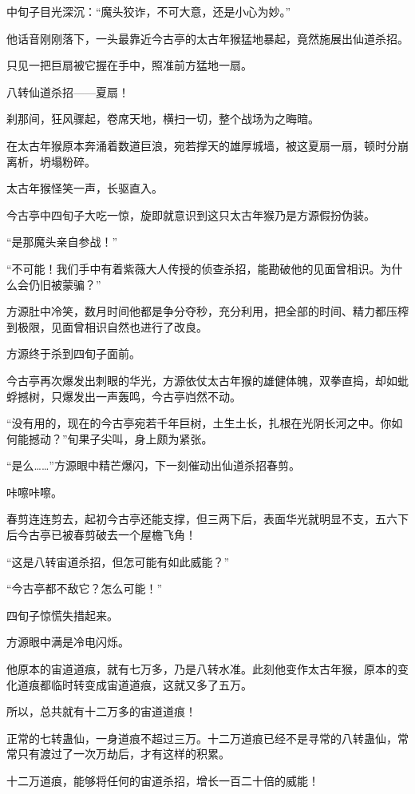 \begin{this_body}
中旬子目光深沉：“魔头狡诈，不可大意，还是小心为妙。”

他话音刚刚落下，一头最靠近今古亭的太古年猴猛地暴起，竟然施展出仙道杀招。

只见一把巨扇被它握在手中，照准前方猛地一扇。

八转仙道杀招——夏扇！

刹那间，狂风骤起，卷席天地，横扫一切，整个战场为之晦暗。

在太古年猴原本奔涌着数道巨浪，宛若撑天的雄厚城墙，被这夏扇一扇，顿时分崩离析，坍塌粉碎。

太古年猴怪笑一声，长驱直入。

今古亭中四旬子大吃一惊，旋即就意识到这只太古年猴乃是方源假扮伪装。

“是那魔头亲自参战！”

“不可能！我们手中有着紫薇大人传授的侦查杀招，能勘破他的见面曾相识。为什么会仍旧被蒙骗？”

方源肚中冷笑，数月时间他都是争分夺秒，充分利用，把全部的时间、精力都压榨到极限，见面曾相识自然也进行了改良。

方源终于杀到四旬子面前。

今古亭再次爆发出刺眼的华光，方源依仗太古年猴的雄健体魄，双拳直捣，却如蚍蜉撼树，只爆发出一声轰鸣，今古亭岿然不动。

“没有用的，现在的今古亭宛若千年巨树，土生土长，扎根在光阴长河之中。你如何能撼动？”旬果子尖叫，身上颇为紧张。

“是么……”方源眼中精芒爆闪，下一刻催动出仙道杀招春剪。

咔嚓咔嚓。

春剪连连剪去，起初今古亭还能支撑，但三两下后，表面华光就明显不支，五六下后今古亭已被春剪破去一个屋檐飞角！

“这是八转宙道杀招，但怎可能有如此威能？”

“今古亭都不敌它？怎么可能！”

四旬子惊慌失措起来。

方源眼中满是冷电闪烁。

他原本的宙道道痕，就有七万多，乃是八转水准。此刻他变作太古年猴，原本的变化道痕都临时转变成宙道道痕，这就又多了五万。

所以，总共就有十二万多的宙道道痕！

正常的七转蛊仙，一身道痕不超过三万。十二万道痕已经不是寻常的八转蛊仙，常常只有渡过了一次万劫后，才有这样的积累。

十二万道痕，能够将任何的宙道杀招，增长一百二十倍的威能！


\end{this_body}
